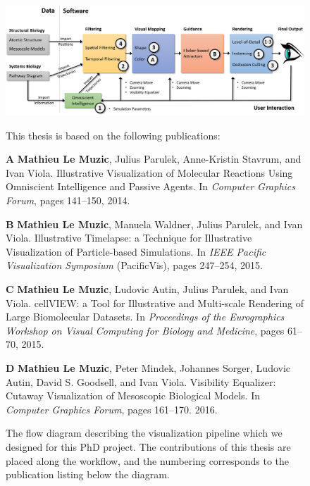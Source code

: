 \begin{figure}
	\centering	
	\caption{The flow diagram describing the visualization pipeline which we designed for this PhD project. 
		The contributions of this thesis are placed along the workflow, and the numbering corresponds to the publication listing below the diagram.}
	
	\subfloat
	{
		\centering
		\includegraphics[width=1\linewidth]{"graphics/master_diagram"}
	}	
	\subfloat
	{		
		This thesis is based on the following publications:		
		\begin{list}{}{}			
			\label{fig:list-contributions}
			\item[\textbf{A}]\textbf{Mathieu Le Muzic}, Julius Parulek, Anne-Kristin Stavrum, and Ivan Viola.
			Illustrative Visualization of Molecular Reactions Using Omniscient Intelligence and Passive Agents. 
			In \textit{Computer Graphics Forum}, pages 141–150, 2014. 
			
			\item[\textbf{B}]\textbf{Mathieu Le Muzic}, Manuela Waldner, Julius Parulek, and Ivan Viola.
			Illustrative Timelapse: a Technique for Illustrative Visualization of Particle-based Simulations. 
			In \textit{IEEE Pacific Visualization Symposium} (PacificVis), pages 247–254, 2015.
			
			\item[\textbf{C}]\textbf{Mathieu Le Muzic}, Ludovic Autin, Julius Parulek, and Ivan Viola.
			cellVIEW: a Tool for Illustrative and Multi-scale Rendering of Large Biomolecular Datasets. 
			In \textit{Proceedings of the Eurographics Workshop on Visual Computing for Biology and Medicine}, pages 61–70, 2015.
			
			\item[\textbf{D}]\textbf{Mathieu Le Muzic}, Peter Mindek, Johannes Sorger, Ludovic Autin, David S. Goodsell, and Ivan Viola.
			Visibility Equalizer: Cutaway Visualization of Mesoscopic Biological Models. 
			In \textit{Computer Graphics Forum}, pages 161–170. 2016.				
		\end{list}			
		
}
\end{figure}
